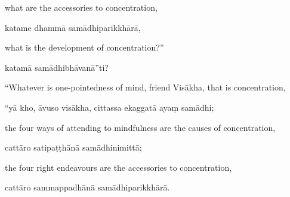 \begin{samepage}
\begin{leftcolumn*}
what are the accessories to concentration,
\end{leftcolumn*}

\begin{rightcolumn}
katame dhammā samādhiparikkhārā,
\end{rightcolumn}
\end{samepage}

\begin{samepage}
\begin{leftcolumn*}
what is the development of concentration?”
\end{leftcolumn*}

\begin{rightcolumn}
katamā samādhibhāvanā”ti?
\end{rightcolumn}
\end{samepage}

\begin{samepage}
\begin{leftcolumn*}
“Whatever is one-pointedness of mind, friend Visākha, that is concentration,
\end{leftcolumn*}

\begin{rightcolumn}
“yā kho, āvuso visākha, cittassa ekaggatā ayaṃ samādhi;
\end{rightcolumn}
\end{samepage}

\begin{samepage}
\begin{leftcolumn*}
the four ways of attending to mindfulness are the causes of concentration,
\end{leftcolumn*}

\begin{rightcolumn}
cattāro satipaṭṭhānā samādhinimittā;
\end{rightcolumn}
\end{samepage}

\begin{samepage}
\begin{leftcolumn*}
the four right endeavours are the accessories to concentration,
\end{leftcolumn*}

\begin{rightcolumn}
cattāro sammappadhānā samādhiparikkhārā.
\end{rightcolumn}
\end{samepage}

